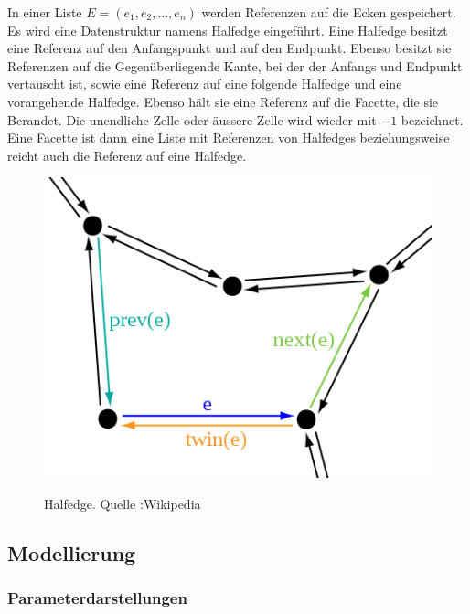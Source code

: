 \begin{Definition}[Halfedge]
In einer Liste $E = (e_1, e_2, \hdots, e_n)$ werden Referenzen auf die Ecken gespeichert.  Es wird eine Datenstruktur namens Halfedge eingeführt.
Eine Halfedge besitzt eine Referenz auf den Anfangspunkt und auf den Endpunkt. Ebenso besitzt sie Referenzen auf die Gegenüberliegende Kante, bei der der Anfangs und Endpunkt vertauscht ist, sowie eine Referenz auf eine folgende Halfedge  und eine vorangehende Halfedge. Ebenso hält sie eine Referenz auf die Facette, die sie Berandet. Die unendliche Zelle oder äussere Zelle wird wieder  mit $-1$ bezeichnet. Eine Facette ist dann eine Liste mit Referenzen von Halfedges beziehungsweise reicht auch die  Referenz auf eine Halfedge.
\end{Definition}

\begin{figure}[H]
    \centering 
    \includegraphics[scale=0.5]{images/halfedge.png}
    \label{fig:halfedge}
    \caption{Halfedge. Quelle :Wikipedia}
\end{figure}

\subsection{Modellierung}

\subsubsection{Parameterdarstellungen}

